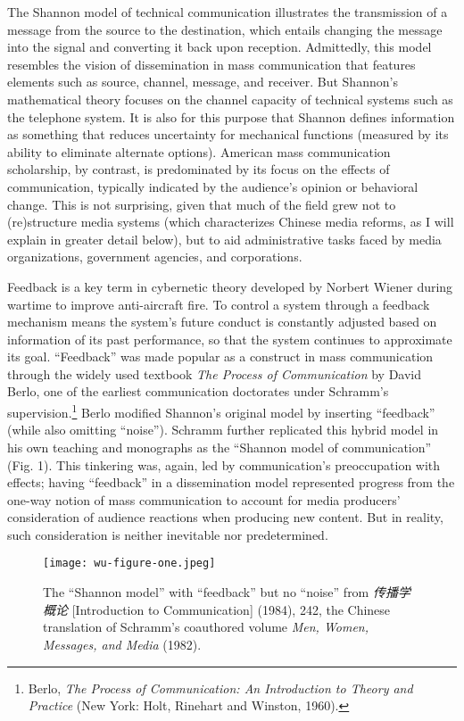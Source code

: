 \documentclass{tufte-handout}
\begin{document}
\begin{CJK*}{UTF8}{gbsn}
The Shannon model of technical communication illustrates the
transmission of a message from the source to the destination, which
entails changing the message into the signal and converting it back upon
reception. Admittedly, this model resembles the vision of dissemination
in mass communication that features elements such as source, channel,
message, and receiver. But Shannon's mathematical theory focuses on the
channel capacity of technical systems such as the telephone system. It
is also for this purpose that Shannon defines information as something
that reduces uncertainty for mechanical functions (measured by its
ability to eliminate alternate options). American mass communication
scholarship, by contrast, is predominated by its focus on the effects of
communication, typically indicated by the audience's opinion or
behavioral change. This is not surprising, given that much of the field
grew not to (re)structure media systems (which characterizes Chinese
media reforms, as I will explain in greater detail below), but to aid
administrative tasks faced by media organizations, government agencies,
and corporations.

Feedback is a key term in cybernetic theory developed by Norbert Wiener
during wartime to improve anti-aircraft fire. To control a system
through a feedback mechanism means the system's future conduct is
constantly adjusted based on information of its past performance, so
that the system continues to approximate its goal. ``Feedback'' was made
popular as a construct in mass communication through the widely used
textbook \emph{The Process of Communication} by David Berlo, one of the
earliest communication doctorates under Schramm's
supervision.\footnote{Berlo, \emph{The Process of Communication: An
  Introduction to Theory and Practice} (New York: Holt, Rinehart and
  Winston, 1960).} Berlo modified Shannon's original model by inserting
``feedback'' (while also omitting ``noise''). Schramm further replicated
this hybrid model in his own teaching and monographs as the ``Shannon
model of communication'' (Fig. 1). This tinkering was, again, led by
communication's preoccupation with effects; having ``feedback'' in a
dissemination model represented progress from the one-way notion of mass
communication to account for media producers' consideration of audience
reactions when producing new content. But in reality, such consideration
is neither inevitable nor predetermined.

\begin{figure}
    \centering
\texttt{[image: wu-figure-one.jpeg]}
    \caption{The ``Shannon model'' with ``feedback'' but no ``noise'' from
\emph{传播学概论} {[}Introduction to Communication{]} (1984), 242, the
Chinese translation of Schramm's coauthored volume \emph{Men, Women,
Messages, and Media} (1982).}
    \label{fig:one}
\end{figure}



\end{CJK*}
\end{document}
